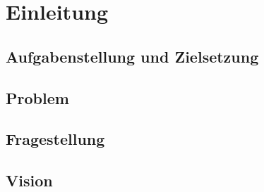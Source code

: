 \chapter{Einleitung}
\label{ch:Einleitung}

\section{Aufgabenstellung und Zielsetzung}


\section{Problem}

\section{Fragestellung}

\section{Vision}

